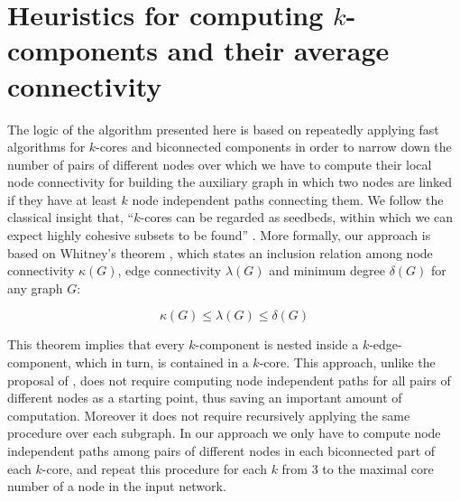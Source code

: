 \section{Heuristics for computing $k$-components and their average connectivity}

The logic of the algorithm presented here is based on repeatedly applying fast algorithms for $k$-cores \citep{batagelj:2011} and biconnected components \citep{tarjan:1972} in order to narrow down the number of pairs of different nodes over which we have to compute their local node connectivity for building the auxiliary graph in which two nodes are linked if they have at least $k$ node independent paths connecting them. We follow the classical insight that, ``$k$-cores can be regarded as seedbeds, within which we can expect highly cohesive subsets to be found'' \citet[281]{seidman:1983}. More formally, our approach is based on Whitney's theorem \citep[328]{white:2001}, which states an inclusion relation among node connectivity $\kappa(G)$, edge connectivity $\lambda(G)$ and minimum degree $\delta(G)$ for any graph $G$:

\begin{equation}
\kappa(G) \le \lambda(G) \le \delta(G)
\end{equation}

This theorem implies that every $k$-component is nested inside a $k$-edge-component, which in turn, is contained in a $k$-core. This approach, unlike the proposal of \citet{white:2001b}, does not require computing node independent paths for all pairs of different nodes as a starting point, thus saving an important amount of computation. Moreover it does not require recursively applying the same procedure over each subgraph. In our approach we only have to compute node independent paths among pairs of different nodes in each biconnected part of each $k$-core, and repeat this procedure for each $k$ from 3 to the maximal core number of a node in the input network.

